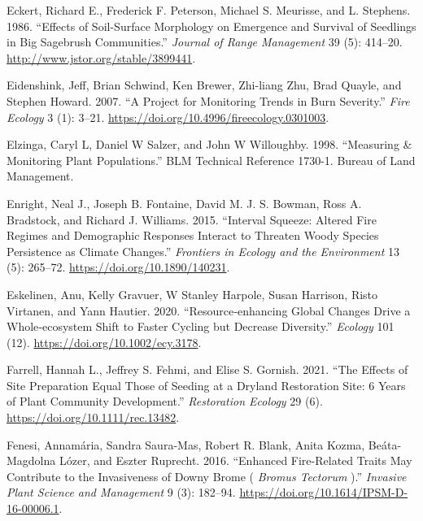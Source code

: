 \documentclass[
  12pt,
]{article}
\newlength{\cslhangindent}
\newlength{\cslentryspacingunit} %
\newenvironment{CSLReferences}[2] %
 {%
  \setlength{\parindent}{0pt}
  \ifodd #1
  \let\oldpar\par
  \def\par{\hangindent=\cslhangindent\oldpar}
  \fi
  \setlength{\parskip}{#2\cslentryspacingunit}
 }%
 {}
\begin{document}
\begin{CSLReferences}{1}{0}
\leavevmode{}%
Eckert, Richard E., Frederick F. Peterson, Michael S. Meurisse, and L.
Stephens. 1986. {``{Effects of Soil-Surface Morphology on Emergence and
Survival of Seedlings in Big Sagebrush Communities}.''} \emph{Journal of
Range Management} 39 (5): 414--20.
\url{http://www.jstor.org/stable/3899441}.

\leavevmode{}%
Eidenshink, Jeff, Brian Schwind, Ken Brewer, Zhi-liang Zhu, Brad Quayle,
and Stephen Howard. 2007. {``{A Project for Monitoring Trends in Burn
Severity}.''} \emph{Fire Ecology} 3 (1): 3--21.
\url{https://doi.org/10.4996/fireecology.0301003}.

\leavevmode{}%
Elzinga, Caryl L, Daniel W Salzer, and John W Willoughby. 1998.
{``Measuring \& {Monitoring} {Plant} {Populations}.''} BLM Technical
Reference 1730-1. Bureau of Land Management.

\leavevmode{}%
Enright, Neal J., Joseph B. Fontaine, David M. J. S. Bowman, Ross A.
Bradstock, and Richard J. Williams. 2015. {``Interval Squeeze: Altered
Fire Regimes and Demographic Responses Interact to Threaten Woody
Species Persistence as Climate Changes.''} \emph{Frontiers in Ecology
and the Environment} 13 (5): 265--72.
\url{https://doi.org/10.1890/140231}.

\leavevmode{}%
Eskelinen, Anu, Kelly Gravuer, W Stanley Harpole, Susan Harrison, Risto
Virtanen, and Yann Hautier. 2020. {``Resource‐enhancing Global Changes
Drive a Whole‐ecosystem Shift to Faster Cycling but Decrease
Diversity.''} \emph{Ecology} 101 (12).
\url{https://doi.org/10.1002/ecy.3178}.

\leavevmode{}%
Farrell, Hannah L., Jeffrey S. Fehmi, and Elise S. Gornish. 2021. {``The
Effects of Site Preparation Equal Those of Seeding at a Dryland
Restoration Site: 6 Years of Plant Community Development.''}
\emph{Restoration Ecology} 29 (6).
\url{https://doi.org/10.1111/rec.13482}.

\leavevmode{}%
Fenesi, Annamária, Sandra Saura-Mas, Robert R. Blank, Anita Kozma,
Beáta-Magdolna Lózer, and Eszter Ruprecht. 2016. {``Enhanced
{Fire}-{Related} {Traits} {May} {Contribute} to the {Invasiveness} of
{Downy} {Brome} ( \emph{{Bromus} Tectorum} ).''} \emph{Invasive Plant
Science and Management} 9 (3): 182--94.
\url{https://doi.org/10.1614/IPSM-D-16-00006.1}.


\end{CSLReferences}
\end{document}

